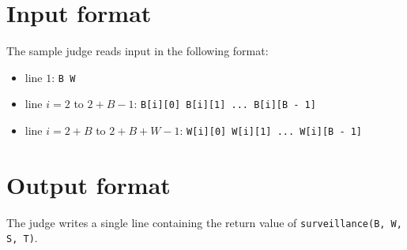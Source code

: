\section*{Input format}
The sample judge reads input in the following format:

\begin{itemize}
  \item line $1$: \texttt{B W}
  \item line $i = 2$ to $2 + B - 1$: \texttt{B[i][0] B[i][1] ... B[i][B - 1]}
  \item line $i = 2 + B$ to $2 + B + W - 1$: \texttt{W[i][0] W[i][1] ... W[i][B - 1]}
\end{itemize}

\section*{Output format}
The judge writes a single line containing the return value of \texttt{surveillance(B, W, S, T)}.
